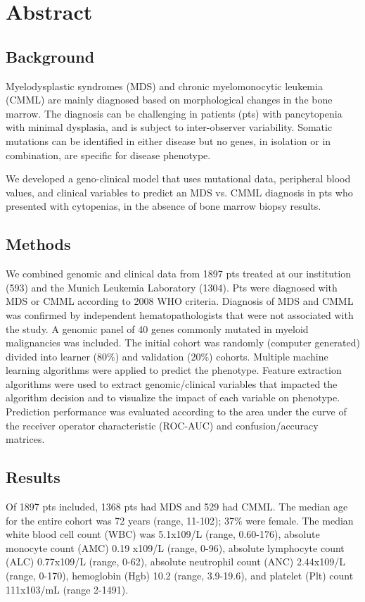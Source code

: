 \section{Abstract}%
\subsection{Background}%

Myelodysplastic syndromes (MDS) and chronic myelomonocytic leukemia (CMML) are mainly diagnosed based on morphological changes in the bone marrow. The diagnosis can be challenging in patients (pts) with pancytopenia with minimal dysplasia, and is subject to inter-observer variability. Somatic mutations can be identified in either disease but no genes, in isolation or in combination, are specific for disease phenotype.

We developed a geno-clinical model that uses mutational data, peripheral blood values, and clinical variables to predict an MDS vs. CMML diagnosis in pts who presented with cytopenias, in the absence of bone marrow biopsy results.


\subsection{Methods}%

We combined genomic and clinical data from 1897 pts treated at our institution (593) and the Munich Leukemia Laboratory (1304). Pts were diagnosed with MDS or CMML according to 2008 WHO criteria. Diagnosis of MDS and CMML was confirmed by independent hematopathologists that were not associated with the study. A genomic panel of 40 genes commonly mutated in myeloid malignancies was included. The initial cohort was randomly (computer generated) divided into learner (80\%) and validation (20\%) cohorts. Multiple machine learning algorithms were applied to predict the phenotype. Feature extraction algorithms were used to extract genomic/clinical variables that impacted the algorithm decision and to visualize the impact of each variable on phenotype. Prediction performance was evaluated according to the area under the curve of the receiver operator characteristic (ROC-AUC) and confusion/accuracy matrices.


\subsection{Results}%

Of 1897 pts included, 1368 pts had MDS and 529 had CMML. The median age for the entire cohort was 72 years (range, 11-102); 37\% were female. The median white blood cell count (WBC) was 5.1x109/L (range, 0.60-176), absolute monocyte count (AMC) 0.19 x109/L (range, 0-96), absolute lymphocyte count (ALC) 0.77x109/L (range, 0-62), absolute neutrophil count (ANC) 2.44x109/L (range, 0-170), hemoglobin (Hgb) 10.2 (range, 3.9-19.6), and platelet (Plt) count 111x103/mL (range 2-1491).


